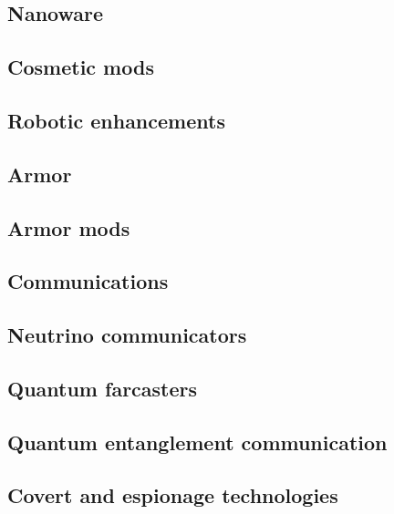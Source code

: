 \subsection{Nanoware}
\label{sec:nanoware}

\subsection{Cosmetic mods}
\label{sec:cosmetic-mods}

\subsection{Robotic enhancements}
\label{sec:robotic-enhancements}

\subsection{Armor}
\label{sec:armor}

\subsection{Armor mods}
\label{sec:armor-mods}

\subsection{Communications}
\label{sec:communications}

\subsection{Neutrino communicators}
\label{sec:neutrino-communicators}

\subsection{Quantum farcasters}
\label{sec:quantum-farcasters}

\subsection{Quantum entanglement communication}
\label{sec:quantum-entanglement-communication}

\subsection{Covert and espionage technologies}
\label{sec:covert-espionage-tech}

